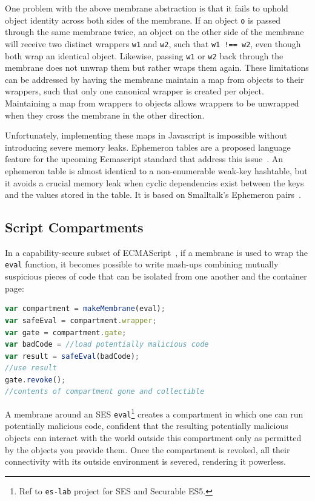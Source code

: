 \documentclass{acm_proc_article-sp}
\begin{document}
One problem with the above membrane abstraction is that it fails to uphold object identity across both sides of the membrane. If an object \texttt{o} is passed through the same membrane twice, an object on the other side of the membrane will receive two distinct wrappers \texttt{w1} and \texttt{w2}, such that \texttt{w1 !== w2}, even though both wrap an identical object. Likewise, passing \texttt{w1} or \texttt{w2} back through the membrane does not unwrap them but rather wraps them again. These limitations can be addressed by having the membrane maintain a map from objects to their wrappers, such that only one canonical wrapper is created per object. Maintaining a map from wrappers to objects allows wrappers to be unwrapped when they cross the membrane in the other direction.

Unfortunately, implementing these maps in Javascript is impossible without introducing severe memory leaks. Ephemeron tables are a proposed language feature for the upcoming Ecmascript standard that address this issue~\cite{miller10et}. An ephemeron table is almost identical to a non-enumerable weak-key hashtable, but it avoids a crucial memory leak when cyclic dependencies exist between the keys and the values stored in the table. It is based on Smalltalk's Ephemeron pairs~\cite{et_paper}.

\subsection{Script Compartments}

In a capability-secure subset of ECMAScript~\cite{ses}, if a membrane is used to wrap the \texttt{eval} function, it becomes possible to write mash-ups combining mutually suspicious pieces of code that can be isolated from one another and the container page:

\begin{lstlisting}[language=javascript]
var compartment = makeMembrane(eval);
var safeEval = compartment.wrapper;
var gate = compartment.gate;
var badCode = //load potentially malicious code
var result = safeEval(badCode);
//use result
gate.revoke();
//contents of compartment gone and collectible
\end{lstlisting}

A membrane around an SES \texttt{eval}\footnote{Ref to \texttt{es-lab} project for SES and Securable ES5.} creates a compartment in which one can run potentially malicious code, confident that the resulting potentially malicious objects can interact with the world outside this compartment only as permitted by the objects you provide them. Once the compartment is revoked, all their connectivity with its outside environment is severed, rendering it powerless.
\end{document}
